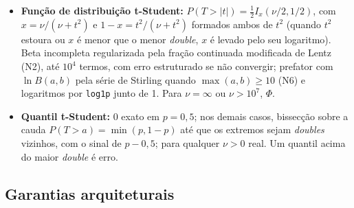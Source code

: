 \documentclass[11pt,a4paper]{article}
\begin{document}
\begin{itemize}
  \item \textbf{Função de distribuição t-Student:} \(P(T > |t|) = \tfrac{1}{2} I_x(\nu/2, 1/2)\), com \(x = \nu/(\nu + t^2)\) e \(1 - x = t^2/(\nu + t^2)\) formados ambos de \(t^2\) (quando \(t^2\) estoura ou \(x\) é menor que o menor \emph{double}, \(x\) é levado pelo seu logaritmo). Beta incompleta regularizada pela fração continuada modificada de Lentz (N2), até \(10^4\) termos, com erro estruturado se não convergir; prefator com \(\ln B(a, b)\) pela série de Stirling quando \(\max(a, b) \geq 10\) (N6) e logaritmos por \texttt{log1p} junto de 1. Para \(\nu = \infty\) ou \(\nu > 10^{7}\), \(\Phi\).
  \item \textbf{Quantil t-Student:} 0 exato em \(p = 0{,}5\); nos demais casos, bissecção sobre a cauda \(P(T > a) = \min(p, 1 - p)\) até que os extremos sejam \emph{doubles} vizinhos, com o sinal de \(p - 0{,}5\); para qualquer \(\nu > 0\) real. Um quantil acima do maior \emph{double} é erro.
\end{itemize}

\subsection{Garantias arquiteturais}
\end{document}
